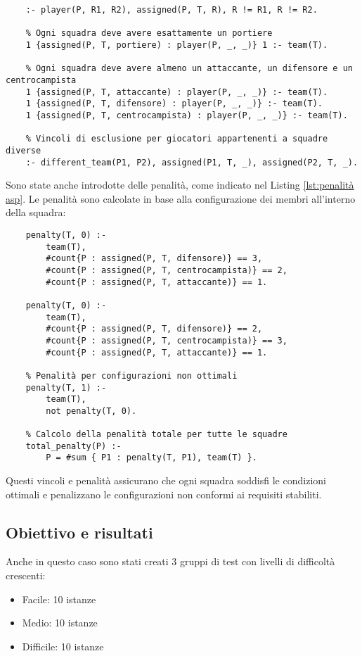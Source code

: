 \documentclass{article}
\begin{document}
\begin{multicols*}{2}
\begin{lstlisting}[style=minizinc, caption={Vincoli ASP}, label={lst:aspVincoli}]
    % Il giocatore deve ricoprire uno dei ruoli che ha scelto
    :- player(P, R1, R2), assigned(P, T, R), R != R1, R != R2.
    
    % Ogni squadra deve avere esattamente un portiere
    1 {assigned(P, T, portiere) : player(P, _, _)} 1 :- team(T).
    
    % Ogni squadra deve avere almeno un attaccante, un difensore e un centrocampista
    1 {assigned(P, T, attaccante) : player(P, _, _)} :- team(T).
    1 {assigned(P, T, difensore) : player(P, _, _)} :- team(T).
    1 {assigned(P, T, centrocampista) : player(P, _, _)} :- team(T).
    
    % Vincoli di esclusione per giocatori appartenenti a squadre diverse
    :- different_team(P1, P2), assigned(P1, T, _), assigned(P2, T, _).
\end{lstlisting}
Sono state anche introdotte delle penalità, come indicato nel Listing \ref{lst:penalità asp}. Le penalità sono calcolate in base alla configurazione dei membri all'interno della squadra:

\begin{lstlisting}[style=minizinc, caption={Penalità ASP}, label={lst:penalità asp}]
    % Calcolo delle penalità per configurazioni ottimali
    penalty(T, 0) :- 
        team(T),
        #count{P : assigned(P, T, difensore)} == 3, 
        #count{P : assigned(P, T, centrocampista)} == 2, 
        #count{P : assigned(P, T, attaccante)} == 1.
    
    penalty(T, 0) :- 
        team(T),
        #count{P : assigned(P, T, difensore)} == 2, 
        #count{P : assigned(P, T, centrocampista)} == 3, 
        #count{P : assigned(P, T, attaccante)} == 1.
    
    % Penalità per configurazioni non ottimali
    penalty(T, 1) :- 
        team(T),
        not penalty(T, 0).
    
    % Calcolo della penalità totale per tutte le squadre
    total_penalty(P) :- 
        P = #sum { P1 : penalty(T, P1), team(T) }.
\end{lstlisting}
Questi vincoli e penalità assicurano che ogni squadra soddisfi le condizioni ottimali e penalizzano le configurazioni non conformi ai requisiti stabiliti.




\subsection{Obiettivo e risultati}
Anche in questo caso sono stati creati 3 gruppi di test con livelli di difficoltà crescenti:
\begin{itemize}
    \item Facile: 10 istanze
    \item Medio: 10 istanze
    \item Difficile: 10 istanze
\end{itemize}











\end{multicols*}
\end{document}
